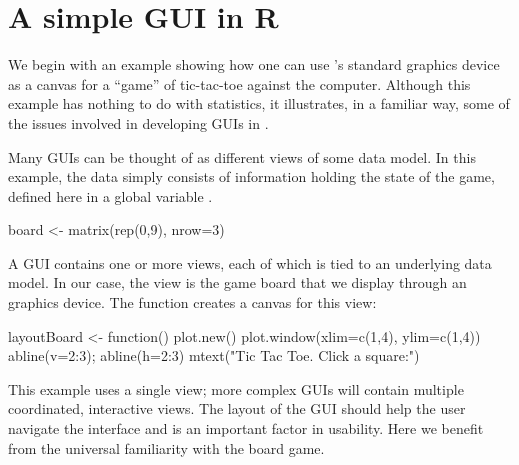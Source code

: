 





\section{A simple GUI in R}
\label{sec:GUI:tic-tac-toe}

We begin with an example showing how one can use \R's standard
graphics device as a canvas for a ``game'' of
tic-tac-toe against the computer. Although this example
has nothing to do with statistics, it illustrates, in a familiar way,
some of the issues involved in developing GUIs in \R. 



Many GUIs can be thought of as different views of some data model.  In
this example, the data simply consists of information holding the
state of the game, defined here in a global variable .

\begin{Schunk}
\begin{Sinput}
 board <- matrix(rep(0,9), nrow=3)      
\end{Sinput}
\end{Schunk}

A GUI contains one or more views, each of which is tied to an
underlying data model. In our case, the view is the game board that we
display through an \R\/ graphics device. The 
function creates a canvas for this view:
\begin{Schunk}
\begin{Sinput}
 layoutBoard <- function() {
   plot.new()
   plot.window(xlim=c(1,4), ylim=c(1,4))
   abline(v=2:3);  abline(h=2:3)
   mtext("Tic Tac Toe. Click a square:")
 }
\end{Sinput}
\end{Schunk}
%
This example uses a single view; more complex GUIs
will contain multiple coordinated, interactive views. The layout of
the GUI should help the user navigate the interface and is an
important factor in usability. Here we benefit from the universal
familiarity with the board game.


